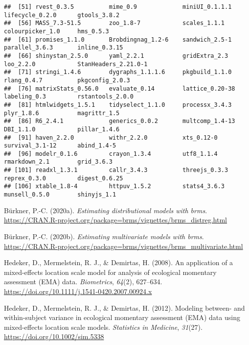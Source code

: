 \documentclass[]{article}
\begin{document}
\begin{verbatim}
##  [51] rvest_0.3.5          mime_0.9             miniUI_0.1.1.1       lifecycle_0.2.0      gtools_3.8.2        
##  [56] MASS_7.3-51.5        zoo_1.8-7            scales_1.1.1         colourpicker_1.0     hms_0.5.3           
##  [61] promises_1.1.0       Brobdingnag_1.2-6    sandwich_2.5-1       parallel_3.6.3       inline_0.3.15       
##  [66] shinystan_2.5.0      yaml_2.2.1           gridExtra_2.3        loo_2.2.0            StanHeaders_2.21.0-1
##  [71] stringi_1.4.6        dygraphs_1.1.1.6     pkgbuild_1.1.0       rlang_0.4.7          pkgconfig_2.0.3     
##  [76] matrixStats_0.56.0   evaluate_0.14        lattice_0.20-38      labeling_0.3         rstantools_2.0.0    
##  [81] htmlwidgets_1.5.1    tidyselect_1.1.0     processx_3.4.3       plyr_1.8.6           magrittr_1.5        
##  [86] R6_2.4.1             generics_0.0.2       multcomp_1.4-13      DBI_1.1.0            pillar_1.4.6        
##  [91] haven_2.2.0          withr_2.2.0          xts_0.12-0           survival_3.1-12      abind_1.4-5         
##  [96] modelr_0.1.6         crayon_1.3.4         utf8_1.1.4           rmarkdown_2.1        grid_3.6.3          
## [101] readxl_1.3.1         callr_3.4.3          threejs_0.3.3        reprex_0.3.0         digest_0.6.25       
## [106] xtable_1.8-4         httpuv_1.5.2         stats4_3.6.3         munsell_0.5.0        shinyjs_1.1
\end{verbatim}

\hypertarget{refs}{}
\leavevmode\hypertarget{ref-Buxfcrkner2020Distributional}{}%
Bürkner, P.-C. (2020a). \emph{Estimating distributional models with
brms}.
\url{https://CRAN.R-project.org/package=brms/vignettes/brms_distreg.html}

\leavevmode\hypertarget{ref-Buxfcrkner2020Multivariate}{}%
Bürkner, P.-C. (2020b). \emph{Estimating multivariate models with brms}.
\url{https://CRAN.R-project.org/package=brms/vignettes/brms_multivariate.html}

\leavevmode\hypertarget{ref-hedekerApplicationMixedeffectsLocation2008}{}%
Hedeker, D., Mermelstein, R. J., \& Demirtas, H. (2008). An application
of a mixed-effects location scale model for analysis of ecological
momentary assessment (EMA) data. \emph{Biometrics}, \emph{64}(2),
627--634. \url{https://doi.org/10.1111/j.1541-0420.2007.00924.x}

\leavevmode\hypertarget{ref-hedekerModelingWithinsubjectVariance2012}{}%
Hedeker, D., Mermelstein, R. J., \& Demirtas, H. (2012). Modeling
between- and within-subject variance in ecological momentary assessment
(EMA) data using mixed-effects location scale models. \emph{Statistics
in Medicine}, \emph{31}(27). \url{https://doi.org/10.1002/sim.5338}
\end{document}
